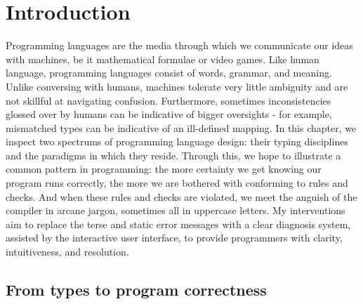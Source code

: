 
\chapter{Introduction}

\label{chap:introduction} 

\graphicspath{{Figures/Introduction}}

Programming languages are the media through which we communicate our ideas with machines, be it mathematical formulae or video games. Like human language, programming languages consist of words, grammar, and meaning. Unlike conversing with humans, machines tolerate very little ambiguity and are not skillful at navigating confusion. Furthermore, sometimes inconsistencies glossed over by humans can be indicative of bigger oversights - for example, mismatched types can be indicative of an ill-defined mapping. In this chapter, we inspect two spectrums of programming language design: their typing disciplines and the paradigms in which they reside. Through this, we hope to illustrate a common pattern in programming: the more certainty we get knowing our program runs correctly, the more we are bothered with conforming to rules and checks. And when these rules and checks are violated, we meet the anguish of the compiler in arcane jargon, sometimes all in uppercase letters. My interventions aim to replace the terse and static error messages with a clear diagnosis system, assisted by the interactive user interface, to provide programmers with clarity, intuitiveness, and resolution.   



\section{From types to program correctness}

